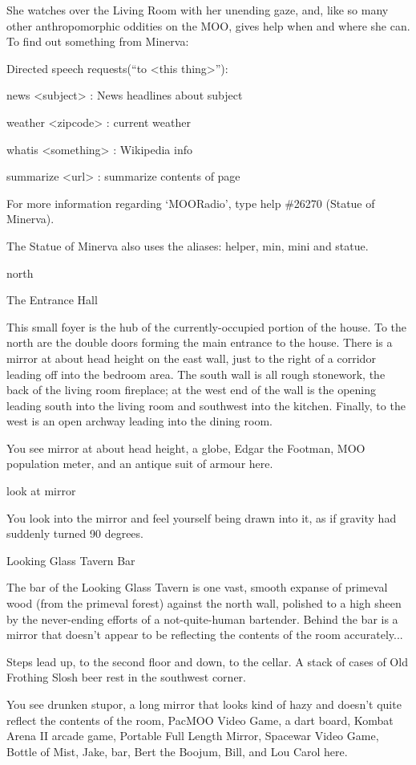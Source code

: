 \documentclass[10pt,twoside,openright]{memoir}
\begin{document}
{She watches over the Living Room with her unending gaze, and, like so many other anthropomorphic oddities on the MOO, gives help when and where she can.  To find out something from Minerva:

Directed speech requests(``to <this thing>''):

news <subject> : News headlines about subject

weather <zipcode> : current weather

whatis <something> : Wikipedia info

summarize <url> : summarize contents of page

For more information regarding `MOORadio', type help \#26270  (Statue of Minerva).

The Statue of Minerva also uses the aliases: helper, min, mini and statue.

north

The Entrance Hall

This small foyer is the hub of the currently-occupied portion of the house.  To the north are the double doors forming the main entrance to the house.  There is a mirror at about head height on the east wall, just to the right of a corridor leading off into the bedroom area.  The south wall is all rough stonework, the back of the living room fireplace; at the west end of the wall is the opening leading south into the living room and southwest into the kitchen.  Finally, to the west is an open archway leading into the dining room.

You see mirror at about head height, a globe, Edgar the Footman, MOO population meter, and an antique suit of armour here.

look at mirror

You look into the mirror and feel yourself being drawn into it, as if gravity had suddenly turned 90 degrees.

Looking Glass Tavern Bar

The bar of the Looking Glass Tavern is one vast, smooth expanse of primeval wood (from the primeval forest) against the north wall, polished to a high sheen by the never-ending efforts of a not-quite-human bartender.  Behind the bar is a mirror that doesn't appear to be reflecting the contents of the room accurately...

Steps lead up, to the second floor and down, to the cellar.  A stack of cases of Old Frothing Slosh beer rest in the southwest corner.

You see drunken stupor, a long mirror that looks kind of hazy and doesn't quite reflect the contents of the room, PacMOO Video Game, a dart board, Kombat Arena II arcade game, Portable Full Length Mirror, Spacewar Video Game, Bottle of Mist, Jake, bar, Bert the Boojum, Bill, and Lou Carol here.

}
\end{document}
